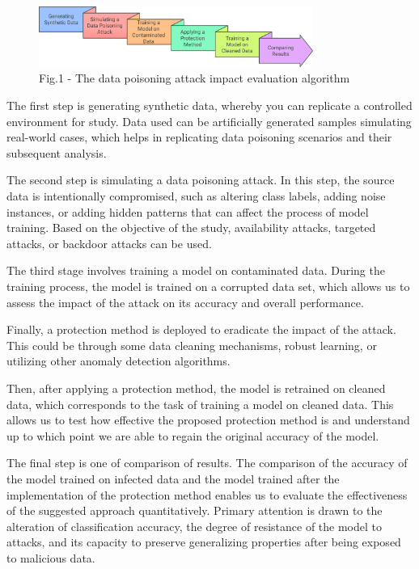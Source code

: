 \begin{figure}[H]
	\centering
	\includegraphics[width=0.8\textwidth]{media/ict2/image224}
	\caption*{Fig.1 - The data poisoning attack impact evaluation algorithm}
\end{figure}

\begin{multicols}{2}
The first step is generating synthetic data, whereby you can replicate a
controlled environment for study. Data used can be artificially
generated samples simulating real-world cases, which helps in
replicating data poisoning scenarios and their subsequent analysis.

The second step is simulating a data poisoning attack. In this step, the
source data is intentionally compromised, such as altering class labels,
adding noise instances, or adding hidden patterns that can affect the
process of model training. Based on the objective of the study,
availability attacks, targeted attacks, or backdoor attacks can be used.

The third stage involves training a model on contaminated data. During
the training process, the model is trained on a corrupted data set,
which allows us to assess the impact of the attack on its accuracy and
overall performance.

Finally, a protection method is deployed to eradicate the impact of the
attack. This could be through some data cleaning mechanisms, robust
learning, or utilizing other anomaly detection algorithms.

Then, after applying a protection method, the model is retrained on
cleaned data, which corresponds to the task of training a model on
cleaned data. This allows us to test how effective the proposed
protection method is and understand up to which point we are able to
regain the original accuracy of the model.

The final step is one of comparison of results. The comparison of the
accuracy of the model trained on infected data and the model trained
after the implementation of the protection method enables us to evaluate
the effectiveness of the suggested approach quantitatively. Primary
attention is drawn to the alteration of classification accuracy, the
degree of resistance of the model to attacks, and its capacity to
preserve generalizing properties after being exposed to malicious data.


\end{multicols}
